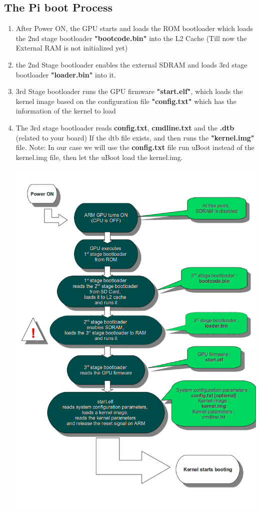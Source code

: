 \documentclass{article}
\begin{document}
\subsection{The Pi boot Process}
\begin{enumerate}
    \item After Power ON, the GPU starts and loads the ROM bootloader which loads the 2nd stage bootloader \textbf{"bootcode.bin"} into the L2 Cache (Till now the External RAM is not initialized yet)
    \item the 2nd Stage bootloader enables the external SDRAM and loads 3rd stage bootloader \textbf{"loader.bin"} into it.
    \item 3rd Stage bootloader runs the GPU firmware \textbf{"start.elf"}, which loads the kernel image based on the configuration file \textbf{"config.txt"} which has the information of the kernel to load
    \item The 3rd stage bootloader reads \textbf{config.txt}, \textbf{cmdline.txt} and the \textbf{.dtb} (related to your board) If the dtb file exists, and then runs the \textbf{"kernel.img"} file.
    Note: In our case we will use the \textbf{config.txt} file run uBoot instead of the kernel.img file, then let the uBoot load the kernel.img.

    \begin{center}
        \includegraphics[scale=0.50]{./resources/img/pi-bootprocess.png}
    \end{center}
\end{enumerate}
\end{document}
